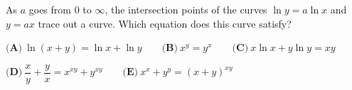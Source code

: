 As $a$ goes from $0$ to $\infty$, the intersection points of the curves $\ln y=a\ln x$ and $y=ax$ trace out a curve. Which equation does this curve satisfy?

$\textbf{(A)}\ \ln(x+y)=\ln x+\ln y\qquad\textbf{(B)}\ x^y=y^x\qquad\textbf{(C)}\ x\ln x+y\ln y=xy$

$\textbf{(D)}\ \dfrac{x}{y}+\dfrac{y}{x}=x^{xy}+y^{xy}\qquad\textbf{(E)}\ x^x+y^y=(x+y)^{xy}$

